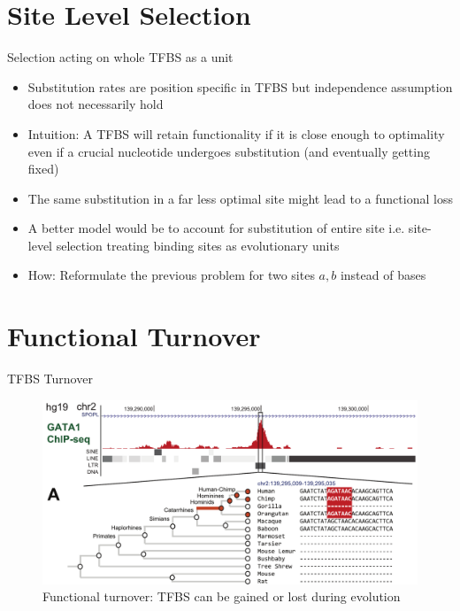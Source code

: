 \documentclass[10pt]{beamer}
\begin{document}
\section{Site Level Selection}



\begin{frame}[fragile]{Selection acting on whole TFBS as a unit}
\begin{itemize}[<+- | alert@+>]
\item Substitution rates are position specific in TFBS but independence assumption does not necessarily hold
\item Intuition: A TFBS will retain functionality if it is close enough to optimality even if a crucial nucleotide undergoes substitution (and eventually getting fixed)
\item The same substitution in a far less optimal site might lead to a functional loss
\item A better model would be to account for substitution of entire site i.e. site-level selection treating binding sites as evolutionary units
\item How: Reformulate the previous problem for two sites $a,b$ instead of bases
\end{itemize}
\end{frame}


\section{Functional Turnover}

\begin{frame}[fragile]{TFBS Turnover}
\begin{figure}
\includegraphics[width=\textwidth]{images/branchorigin}
\caption{Functional turnover: TFBS can be gained or lost during evolution}
\end{figure}
\end{frame}
\end{document}
